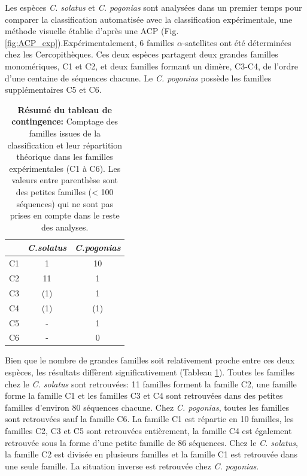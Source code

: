 \documentclass[12pt,a4paper]{article}
\begin{document}
	Les espèces \textit{C. solatus} et \textit{C. pogonias} sont analysées dans un premier temps pour comparer la classification automatisée avec la classification expérimentale, une méthode visuelle établie d'après une ACP (Fig. \ref{fig:ACP_exp}).Expérimentalement, 6 familles $\alpha$-satellites ont été déterminées chez les Cercopithèques. Ces deux espèces partagent deux grandes familles monomériques, C1 et C2, et deux familles formant un dimère, C3-C4, de l'ordre d'une centaine de séquences chacune. Le \textit{C. pogonias} possède les familles supplémentaires C5 et C6.\\
		\begin{table}
			\center
			\begin{tabular}{|c|c|c|}
	    	\hline
			\backslashbox{\bf{Fam. exp.}}{\bf{Espèces}} & \textit{C.solatus} & \textit{C.pogonias}\\
			\hline
			C1 &  1  & 10\\
			\hline
			C2 & 11  & 1 \\
			\hline
			C3 & (1) & 1 \\
			\hline
			C4 & (1) & (1) \\
			\hline
			C5 & - 	 &  1 \\
			\hline
			C6 & -   &  0 \\
			\hline
		\end{tabular}
		\caption{\textbf{Résumé du tableau de contingence:} Comptage des familles issues de la classification et leur répartition théorique dans les familles expérimentales (C1 à C6). Les valeurs entre parenthèse sont des petites familles (< 100 séquences) qui ne sont pas prises en compte dans le reste des analyses.}
		\label{tab_count_fam}
	\end{table}	
	Bien que le nombre de grandes familles soit relativement proche entre ces deux espèces, les résultats diffèrent significativement (Tableau \ref{tab_count_fam}). Toutes les familles chez le \textit{C. solatus} sont retrouvées: 11 familles forment la famille C2, une famille forme la famille C1 et les familles C3 et C4 sont retrouvées dans des petites familles d'environ 80 séquences chacune. Chez \textit{C. pogonias}, toutes les familles sont retrouvées sauf la famille C6. La famille C1 est répartie en 10 familles, les familles C2, C3 et C5 sont retrouvées entièrement, la famille C4 est également retrouvée sous la forme d'une petite famille de 86 séquences. Chez le \textit{C. solatus}, la famille C2 est divisée en plusieurs familles et la famille C1 est retrouvée dans une seule famille. La situation inverse est retrouvée  chez \textit{C. pogonias}.
\end{document}
